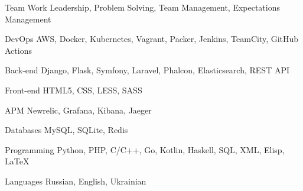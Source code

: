 
\begin{cvskills}

  \cvskill
    {Team Work}
    {Leadership, Problem Solving, Team Management, Expectations Management}

  \cvskill
    {DevOps}
    {AWS, Docker, Kubernetes, Vagrant, Packer, Jenkins, TeamCity, GitHub Actions}

  \cvskill
    {Back-end}
    {Django, Flask, Symfony, Laravel, Phalcon, Elasticsearch, REST API}

  \cvskill
    {Front-end}
    {HTML5, CSS, LESS, SASS}

  \cvskill
    {APM}
    {Newrelic, Grafana, Kibana, Jaeger}

  \cvskill
    {Databases}
    {MySQL, SQLite, Redis}

  \cvskill
    {Programming}
    {Python, PHP, C/C++, Go, Kotlin, Haskell, SQL, XML, Elisp, \LaTeX}

  \cvskill
    {Languages}
    {Russian, English, Ukrainian}

  \cvskill
    {}
    {}

  \cvskill
    {}
    {}
\end{cvskills}
